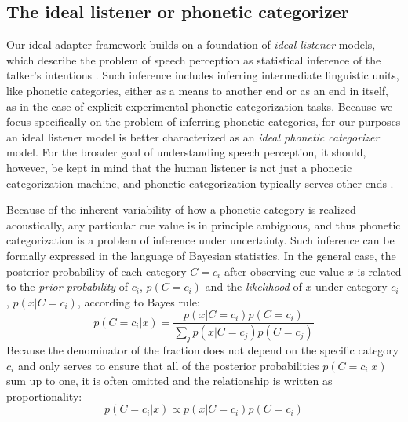 \subsection{The ideal listener or phonetic categorizer}
\label{sec:ideal-phon-categ}

Our ideal adapter framework builds on a foundation of {\em ideal listener} models, which describe the problem of speech perception as statistical inference of the talker's intentions \cite{Clayards2008,Feldman2009a,Norris2008,Sonderegger2010}. Such inference includes inferring intermediate linguistic units, like phonetic categories, either as a means to another end or as an end in itself, as in the case of explicit experimental phonetic categorization tasks.  Because we focus specifically on the problem of inferring phonetic categories, for our purposes an ideal listener model is better characterized as an {\em ideal phonetic categorizer} model. For the broader goal of understanding speech perception, it should, however, be kept in mind that the human listener is not just a phonetic categorization machine, and phonetic categorization typically serves other ends \autocites[such as lexical access,][]{Norris2008}[or even the successful inference of communicative intentions][]{Jaeger2013b}.

Because of the inherent variability of how a phonetic category is realized acoustically, any particular cue value is in principle ambiguous, and thus phonetic categorization is a problem of inference under uncertainty.  Such inference can be formally expressed in the language of Bayesian statistics.  In the general case, the posterior probability of each category $C=c_i$ after observing cue value $x$ is related to the \emph{prior probability} of $c_i$,  $p(C=c_i)$ and the \emph{likelihood} of $x$ under category $c_i$, $p(x|C=c_i)$, according to Bayes rule:
\begin{equation*}
  p(C=c_i | x) = \frac{p(x | C=c_i) p(C=c_i)}{\sum_j p(x|C=c_j) p(C=c_j)}  %
\end{equation*}
Because the denominator of the fraction does not depend on the specific category $c_i$ and only serves to ensure that all of the posterior probabilities $p(C=c_i | x)$ sum up to one, it is often omitted and the relationship is written as proportionality:
\begin{equation*}
  p(C=c_i | x) \propto p(x | C=c_i) p(C=c_i)
\end{equation*}

